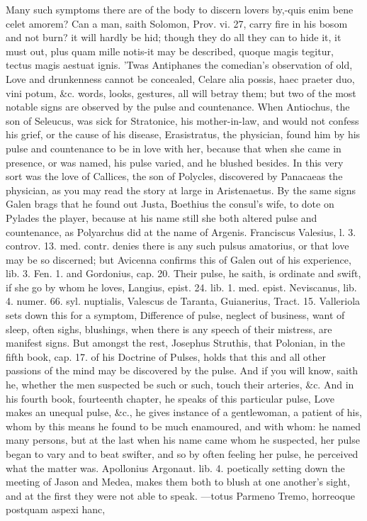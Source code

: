 {Many such symptoms there are of the body to discern lovers by,-quis
enim bene celet amorem? Can a man, saith Solomon, Prov. vi. 27, carry
fire in his bosom and not burn? it will hardly be hid; though they do
all they can to hide it, it must out, plus quam mille notis-it may be
described, quoque magis tegitur, tectus magis aestuat ignis.
'Twas Antiphanes the comedian's observation of old, Love and
drunkenness cannot be concealed, Celare alia possis, haec praeter duo,
vini potum, \&c. words, looks, gestures, all will betray them; but two
of the most notable signs are observed by the pulse and countenance.
When Antiochus, the son of Seleucus, was sick for Stratonice, his
mother-in-law, and would not confess his grief, or the cause of his
disease, Erasistratus, the physician, found him by his pulse and
countenance to be in love with her, because that when she came in
presence, or was named, his pulse varied, and he blushed besides. In
this very sort was the love of Callices, the son of Polycles,
discovered by Panacaeas the physician, as you may read the story at
large in Aristenaetus. By the same signs Galen brags that he
found out Justa, Boethius the consul's wife, to dote on Pylades the
player, because at his name still she both altered pulse and
countenance, as  Polyarchus did at the name of Argenis.
Franciscus Valesius, l. 3. controv. 13. med. contr. denies there is any
such pulsus amatorius, or that love may be so discerned; but Avicenna
confirms this of Galen out of his experience, lib. 3. Fen. 1. and
Gordonius, cap. 20. Their pulse, he saith, is ordinate and swift,
if she go by whom he loves, Langius, epist. 24. lib. 1. med. epist.
Neviscanus, lib. 4. numer. 66. syl. nuptialis, Valescus de Taranta,
Guianerius, Tract. 15. Valleriola sets down this for a symptom,
Difference of pulse, neglect of business, want of sleep, often
sighs, blushings, when there is any speech of their mistress, are
manifest signs. But amongst the rest, Josephus Struthis, that Polonian,
in the fifth book, cap. 17. of his Doctrine of Pulses, holds that this
and all other passions of the mind may be discovered by the pulse.
And if you will know, saith he, whether the men suspected be such
or such, touch their arteries, \&c. And in his fourth book, fourteenth
chapter, he speaks of this particular pulse,  Love makes an
unequal pulse, \&c., he gives instance of a gentlewoman, a patient
of his, whom by this means he found to be much enamoured, and with
whom: he named many persons, but at the last when his name came whom he
suspected, her pulse began to vary and to beat swifter, and so by
often feeling her pulse, he perceived what the matter was. Apollonius
Argonaut. lib. 4. poetically setting down the meeting of Jason and
Medea, makes them both to blush at one another's sight, and at the
first they were not able to speak.
---totus Parmeno
Tremo, horreoque postquam aspexi hanc,

}
